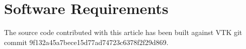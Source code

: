 \documentclass{InsightArticle}
\begin{document}
\section{Software Requirements}

The source code contributed with this article has been built against VTK git commit 9f132a45a7bece15d77ad74723c6378f2f29d869.

%
%




%
%



\end{document}
